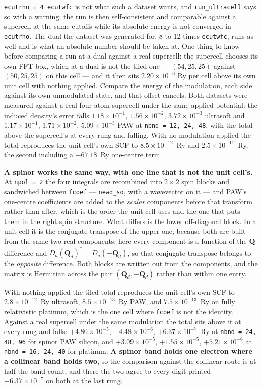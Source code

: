 \documentclass[11pt,a4paper]{article}
\newcommand{\code}[1]{\texttt{\small #1}}
\begin{document}
\code{ecutrho = 4 ecutwfc} is not what such a dataset wants, and
\code{run\_ultracell} says so with a warning: the run is then self-consistent
and comparable against a supercell at the same cutoffs while its absolute
energy is not converged in \code{ecutrho}. The dual the dataset was generated
for, 8 to 12 times \code{ecutwfc}, runs as well and is what an absolute number
should be taken at. One thing to know before comparing a run at a dual against
a real supercell: the supercell chooses its own FFT box, which at a dual is not
the tiled one --- $(54, 25, 25)$ against $(50, 25, 25)$ on this cell --- and it
then sits $2.20\times10^{-6}$ Ry per cell above its own unit cell with nothing
applied. Compare the energy of the modulation, each side against its own
unmodulated state, and that offset cancels. Both datasets were measured against a real
four-atom supercell under the same applied potential: the induced density's
error falls $1.18\times10^{-1}$, $1.56\times10^{-2}$, $3.72\times10^{-3}$
ultrasoft and $1.17\times10^{-1}$, $1.71\times10^{-2}$, $5.09\times10^{-3}$ PAW
at \code{nbnd = 12, 24, 48}, with the total above the supercell's at every rung
and falling. With no modulation applied the total reproduces the unit cell's own
SCF to $8.5\times10^{-12}$~Ry and $2.5\times10^{-11}$~Ry, the second including a
$-67.18$~Ry one-centre term.

\textbf{A spinor works the same way, with one line that is not the unit cell's.}
At \code{npol = 2} the four integrals are recombined into $2\times2$ spin blocks
and sandwiched between \code{fcoef} --- \code{newd\_so}, with a wavevector on it
--- and PAW's one-centre coefficients are added to the \emph{scalar} components
before that transform rather than after, which is the order the unit cell uses
and the one that puts them in the right spin structure. What differs is the lower
off-diagonal block. In a unit cell it is the conjugate transpose of the upper one,
because both are built from the same two real components; here every component is
a function of the $\mathbf Q$-difference and
$D_a(\mathbf Q_d)^{*} = D_a(-\mathbf Q_d)$, so that conjugate transpose belongs
to the \emph{opposite} difference. Both blocks are written out from the
components, and the matrix is Hermitian across the pair
$(\mathbf Q_d, -\mathbf Q_d)$ rather than within one entry.

With nothing applied the tiled total reproduces the unit cell's own SCF to
$2.8\times10^{-12}$~Ry ultrasoft, $8.5\times10^{-13}$~Ry PAW, and
$7.5\times10^{-13}$~Ry on fully relativistic platinum, which is the one cell
where \code{fcoef} is not the identity. Against a real supercell under the same
modulation the total sits above it at every rung and falls:
$+4.80\times10^{-5}$, $+4.48\times10^{-6}$, $+6.37\times10^{-7}$~Ry at
\code{nbnd = 24, 48, 96} for spinor PAW silicon, and $+3.09\times10^{-5}$,
$+1.55\times10^{-5}$, $+5.21\times10^{-6}$ at \code{nbnd = 16, 24, 40} for
platinum. \textbf{A spinor band holds one electron where a collinear band holds
two}, so the comparison against the collinear route is at half the band count,
and there the two agree to every digit printed --- $+6.37\times10^{-7}$ on both
at the last rung.
\end{document}
